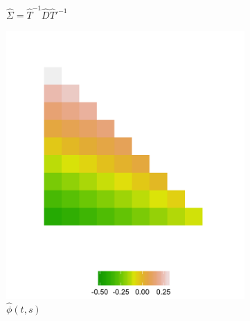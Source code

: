 \begin{figure}[H]
\begin{subfigure}[t]{.48\textwidth}
 \caption{\textit{ $\hat{\Sigma} = \hat{T}^{-1} \hat{D} \hat{T}'^{-1} $}}
\label{fig:fitted-cholesky-decomposition-cattle-date-Sigma}
 \end{subfigure}
  \begin{subfigure}[t]{.48\textwidth}
  \centering
  \includegraphics[width = \textwidth]{img/chapter-5/cattle-cholesky-estimate-ggplot-phi}
 \caption{\textit{$\hat{\phi}\left(t,s\right)$}} \label{fig:fitted-cholesky-decomposition-cattle-date-phi}
 \end{subfigure}
 \begin{subfigure}[t]{.48\textwidth}
  \centering

\end{subfigure}
\end{figure}
